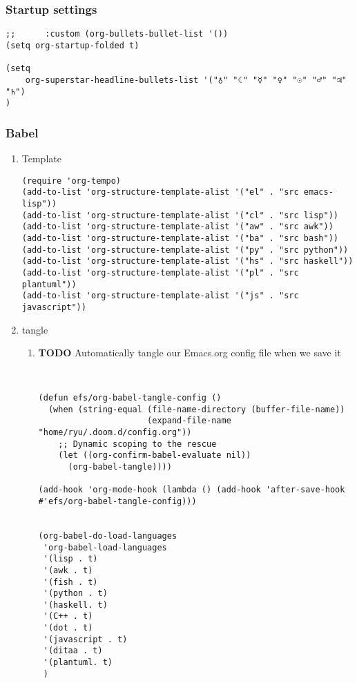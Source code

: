 \documentclass[11pt]{article}
\begin{document}
\subsubsection{Startup settings}
\label{sec:org1d8bccd}
\begin{verbatim}
;;      :custom (org-bullets-bullet-list '())
(setq org-startup-folded t)

(setq
    org-superstar-headline-bullets-list '("♁" "☾" "☿" "♀" "☉" "♂" "♃" "♄")
)
\end{verbatim}
\subsubsection{Babel}
\label{sec:orgaeb8a4c}
\begin{enumerate}
\item Template
\label{sec:org27adde5}
\begin{verbatim}
(require 'org-tempo)
(add-to-list 'org-structure-template-alist '("el" . "src emacs-lisp"))
(add-to-list 'org-structure-template-alist '("cl" . "src lisp"))
(add-to-list 'org-structure-template-alist '("aw" . "src awk"))
(add-to-list 'org-structure-template-alist '("ba" . "src bash"))
(add-to-list 'org-structure-template-alist '("py" . "src python"))
(add-to-list 'org-structure-template-alist '("hs" . "src haskell"))
(add-to-list 'org-structure-template-alist '("pl" . "src plantuml"))
(add-to-list 'org-structure-template-alist '("js" . "src javascript"))
\end{verbatim}

\item tangle
\label{sec:org36f2b55}
\begin{enumerate}
\item {\bfseries\sffamily TODO} Automatically tangle our Emacs.org config file when we save it
\label{sec:org2e49d61}
\begin{verbatim}


(defun efs/org-babel-tangle-config ()
  (when (string-equal (file-name-directory (buffer-file-name))
                      (expand-file-name "home/ryu/.doom.d/config.org"))
    ;; Dynamic scoping to the rescue
    (let ((org-confirm-babel-evaluate nil))
      (org-babel-tangle))))

(add-hook 'org-mode-hook (lambda () (add-hook 'after-save-hook #'efs/org-babel-tangle-config)))


(org-babel-do-load-languages
 'org-babel-load-languages
 '(lisp . t)
 '(awk . t)
 '(fish . t)
 '(python . t)
 '(haskell. t)
 '(C++ . t)
 '(dot . t)
 '(javascript . t)
 '(ditaa . t)
 '(plantuml. t)
 )

\end{verbatim}
\end{enumerate}
\end{enumerate}
\end{document}

